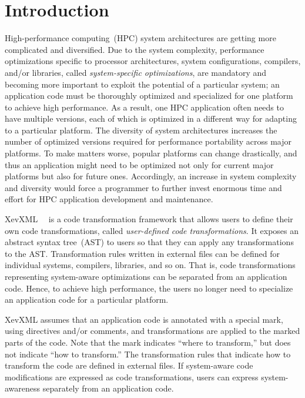 \chapter{Introduction}\label{cap:intro}

High-performance computing~(HPC) system architectures are getting more
complicated and diversified. Due to the system complexity, performance
optimizations specific to processor architectures, system
configurations, compilers, and/or libraries, called
\emph{system-specific optimizations}, are mandatory and becoming more
important to exploit the potential of a particular system; an
application code must be thoroughly optimized and specialized for one
platform to achieve high performance.  As a result, one HPC application
often needs to have multiple versions, each of which is optimized in a
different way for adapting to a particular platform.  The diversity of
system architectures increases the number of optimized versions required
for performance portability across major platforms.  To make matters
worse, popular platforms can change drastically, and thus an application
might need to be optimized not only for current major platforms but also
for future ones.  Accordingly, an increase in system complexity and
diversity would force a programmer to further invest enormous time and
effort for HPC application development and maintenance.



XevXML~\cite{xevxml-hipc}~\cite{xevxml-sc13} is a code transformation
framework that allows users to define their own code transformations,
called \emph{user-defined code transformations}.  It exposes an
abstract syntax tree~(AST) to users so that they can apply any
transformations to the AST. Transformation rules written in external
files can be defined for individual systems, compilers, libraries, and
so on.  That is, code transformations representing system-aware
optimizations can be separated from an application code.  Hence, to
achieve high performance, the users no longer need to specialize an
application code for a particular platform.

XevXML assumes that an application code is annotated with a special
mark, using directives and/or comments, and transformations are applied
to the marked parts of the code.  Note that the mark indicates ``where
to transform,'' but does not indicate ``how to transform.''  The
transformation rules that indicate how to transform the code are defined
in external files. If system-aware code modifications are expressed as
code transformations, users can express system-awareness separately from
an application code.

